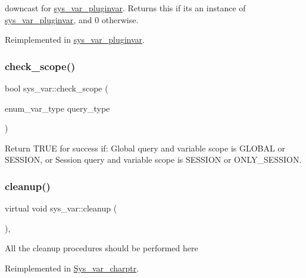 downcast for \mbox{\hyperlink{classsys__var__pluginvar}{sys\+\_\+var\+\_\+pluginvar}}. Returns this if it\textquotesingle{}s an instance of \mbox{\hyperlink{classsys__var__pluginvar}{sys\+\_\+var\+\_\+pluginvar}}, and 0 otherwise. 

Reimplemented in \mbox{\hyperlink{classsys__var__pluginvar_a046db7b6bad8a43d72d0c82ae81653df}{sys\+\_\+var\+\_\+pluginvar}}.

\mbox{\label{classsys__var_a7d4ec87017ce1f1c0ad0441b78c9fe13}} 
\subsubsection{\texorpdfstring{check\+\_\+scope()}{check\_scope()}}
{\footnotesize\ttfamily bool sys\+\_\+var\+::check\+\_\+scope (\begin{DoxyParamCaption}\item[{enum\+\_\+var\+\_\+type}]{query\+\_\+type }\end{DoxyParamCaption})\hspace{0.3cm}{\ttfamily [inline]}}

Return T\+R\+UE for success if\+: Global query and variable scope is G\+L\+O\+B\+AL or S\+E\+S\+S\+I\+ON, or Session query and variable scope is S\+E\+S\+S\+I\+ON or O\+N\+L\+Y\+\_\+\+S\+E\+S\+S\+I\+ON. \mbox{\label{classsys__var_a5b6d43884f67de0f40f441d9cf724589}} 
\subsubsection{\texorpdfstring{cleanup()}{cleanup()}}
{\footnotesize\ttfamily virtual void sys\+\_\+var\+::cleanup (\begin{DoxyParamCaption}{ }\end{DoxyParamCaption})\hspace{0.3cm}{\ttfamily [inline]}, {\ttfamily [virtual]}}

All the cleanup procedures should be performed here 

Reimplemented in \mbox{\hyperlink{classSys__var__charptr_a7cb7fcaf1b60752b38bfcff61e92b2ca}{Sys\+\_\+var\+\_\+charptr}}.

\mbox{\label{classsys__var_a9c49fcf3475337b962837782f5dbb9e6}} 
